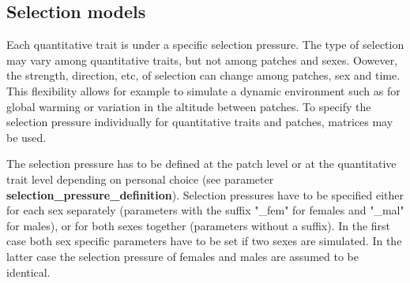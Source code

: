 \documentclass[letterpaper,12pt,oneside]{book}
\begin{document}
\subsection{Selection models}\label{selectionModels}
Each quantitative trait is under a specific selection pressure. The type of selection may vary among quantitative traits, but not among patches and sexes. Oowever, the strength, direction, etc,  of selection can change among patches, sex and time. This flexibility allows for example to simulate a dynamic environment such as for global warming or variation in the altitude between patches. To specify the selection pressure individually for quantitative traits and patches, matrices may be used. 

The selection pressure has to be defined at the patch level  or at the quantitative trait level depending on personal choice (see parameter \textbf{selection\_pressure\_definition}). Selection pressures have to be specified either for each sex separately (parameters with the suffix "\_fem" for females and "\_mal" for males), or for both sexes together (parameters without a suffix). In the first case both sex specific parameters have to be set if two sexes are simulated. In the latter case the selection pressure of females and males are assumed to be identical.
\end{document}
